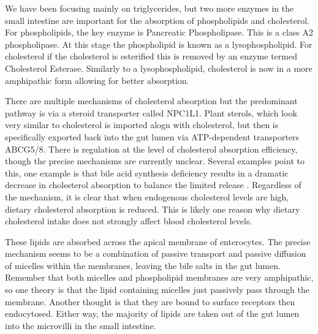 \documentclass{tufte-handout}
\begin{document}
  We have been focusing mainly on triglycerides, but two more enzymes in the small intestine are important for the absorption of phospholipids and cholesterol.  For phospholipids, the key enzyme is Pancreatic Phospholipase.  This is a class A2 phospholipase.  At this stage the phospholipid is known as a lysophospholipid.  For cholesterol if the cholesterol is esterified this is removed by an enzyme termed Cholesterol Esterase.  Similarly to a lysophospholipid, cholesterol is now in a more amphipathic form allowing for better absorption.


  There are multiple mechanisms of cholesterol absorption but the predominant pathway is via a steroid transporter called NPC1L1\citep{Altmann2004,Iqbal2005}.  Plant sterols, which look very similar to cholesterol is imported alogn with cholesterol, but then is specifically exported back into the gut lumen via ATP-dependent transporters ABCG5/8.  There is regulation at the level of cholesterol absorption efficiency, though the precise mechanisms are currently unclear.  Several examples point to this, one example is that bile acid synthesis deficiency results in a dramatic decrease in cholesterol absorption to balance the limited release \citep{Repa2000,Wang2007d}.  Regardless of the mechanism, it is clear that when endogenous cholesterol levels are high, dietary cholesterol absorption is reduced.  This is likely one reason why dietary cholesterol intake does not strongly affect blood cholesterol levels.

  These lipids are absorbed across the apical membrane of enterocytes.  The precise mechanism seems to be a combination of passive transport and passive diffusion of micelles within the membranes, leaving the bile salts in the gut lumen.  Remember that both micelles and phospholipid membranes are very amphipathic, so one theory is that the lipid containing micelles just passively pass through the membrane.  Another thought is that they are bound to surface receptors then endocytosed.  Either way, the majority of lipids are taken out of the gut lumen into the microvilli in the small intestine.
\end{document}
